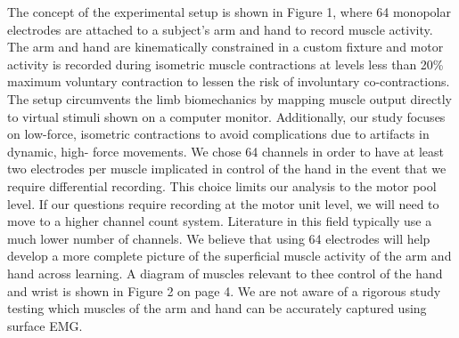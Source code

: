 \documentclass[
  a4paper,
]{article}
\begin{document}
The concept of the experimental setup is shown in Figure 1, where 64
monopolar electrodes are attached to a subject's arm and hand to record
muscle activity. The arm and hand are kinematically constrained in a
custom fixture and motor activity is recorded during isometric muscle
contractions at levels less than 20\% maximum voluntary contraction to
lessen the risk of involuntary co-contractions. The setup circumvents
the limb biomechanics by mapping muscle output directly to virtual
stimuli shown on a computer monitor. Additionally, our study focuses on
low-force, isometric contractions to avoid complications due to
artifacts in dynamic, high- force movements. We chose 64 channels in
order to have at least two electrodes per muscle implicated in control
of the hand in the event that we require differential recording. This
choice limits our analysis to the motor pool level. If our questions
require recording at the motor unit level, we will need to move to a
higher channel count system. Literature in this field typically use a
much lower number of channels. We believe that using 64 electrodes will
help develop a more complete picture of the superficial muscle activity
of the arm and hand across learning. A diagram of muscles relevant to
thee control of the hand and wrist is shown in Figure 2 on page 4. We
are not aware of a rigorous study testing which muscles of the arm and
hand can be accurately captured using surface EMG.
\end{document}

